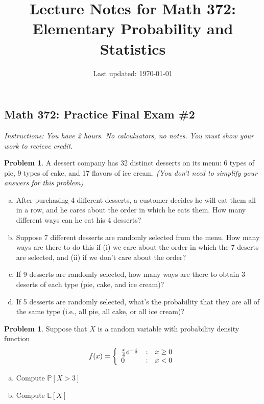 \documentclass[10pt]{article}
\title{Lecture Notes for Math 372: \\Elementary Probability and Statistics}
\date{Last updated: \today}
\theoremstyle{definition}
\newtheorem{problem}[theorem]{Problem}
\newcommand{\1}[1]{\textbf{1}_{\left[#1\right]}} %
\def\E{\mathbb{E}} %
\def\P{\mathbb{P}} %
\begin{document}
\begin{center}
  \section*{Math 372: Practice Final Exam \#2}
\end{center}

\textit{Instructions: You have 2 hours. No calculuators, no notes. You must
show your work to recieve credit.}

\vspace{1em}


\begin{problem}%
  A dessert company has 32 distinct desserts on its menu: 6 types of pie, 9 types of cake, and 17 flavors of ice
  cream. \textit{(You don't need to simplify your answers for this problem)}
  \begin{enumerate}[(a)]
    \item After purchasing 4 different desserts, a customer decides he will eat them all in a row, and he
    cares about the order in which he eats them. How many different ways can he eat his 4 desserts?
    \item Suppose 7 different desserts are randomly selected from the menu. How many ways are there to do
    this if (i) we care about the order in which the 7 deserts are selected, and (ii) if we don't care
    about the order?
    \item If 9 desserts are randomly selected, how many ways are there to obtain 3 deserts of each type
    (pie, cake, and ice cream)?
    \item If 5 desserts are randomly selected, what's the probability that they are all of the same
    type  (i.e., all pie, all cake, or all ice cream)?
  \end{enumerate}
\end{problem}

\begin{problem}
  Suppose that $X$ is a random variable with probability density function
  \begin{equation*}
    f(x) = \left\{ \begin{array}{l@{\quad:\quad}l} \frac{x}{4}e^{-\frac{x}{2}} & x \geq 0\\ 0& x <0\end{array}\right.
  \end{equation*}
  \begin{enumerate}[(a)]
    \item Compute $\P\left[X>3 \right]$
    \item Compute $\E\left[X \right]$
  \end{enumerate}
\end{problem}
\end{document}
